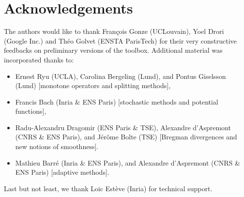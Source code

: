 \documentclass[11pt,a4paper]{article}
\begin{document}
\section*{Acknowledgements}
The authors would like to thank Fran\c{c}ois Gonze (UCLouvain), Yoel Drori (Google Inc.) and Th\'eo Golvet (ENSTA ParisTech) for their very constructive feedbacks on preliminary versions of the toolbox.
Additional material was incorporated thanks to:
\begin{itemize}
	\item Ernest Ryu (UCLA), Carolina Bergeling (Lund), and Pontus Giselsson (Lund) [monotone operators and splitting methods],
	\item Francis Bach (Inria \& ENS Paris) [stochastic methods and potential functions],
	\item Radu-Alexandru Dragomir (ENS Paris \& TSE), Alexandre d'Aspremont (CNRS \& ENS Paris), and J\'er\^ome Bolte (TSE) [Bregman divergences and new notions of smoothness].	
	\item Mathieu Barr\'e (Inria \& ENS Paris), and Alexandre d'Aspremont (CNRS \& ENS Paris) [adaptive methods].
\end{itemize}
Last but not least, we thank Loic Est\`eve (Inria) for technical support.
\end{document}
